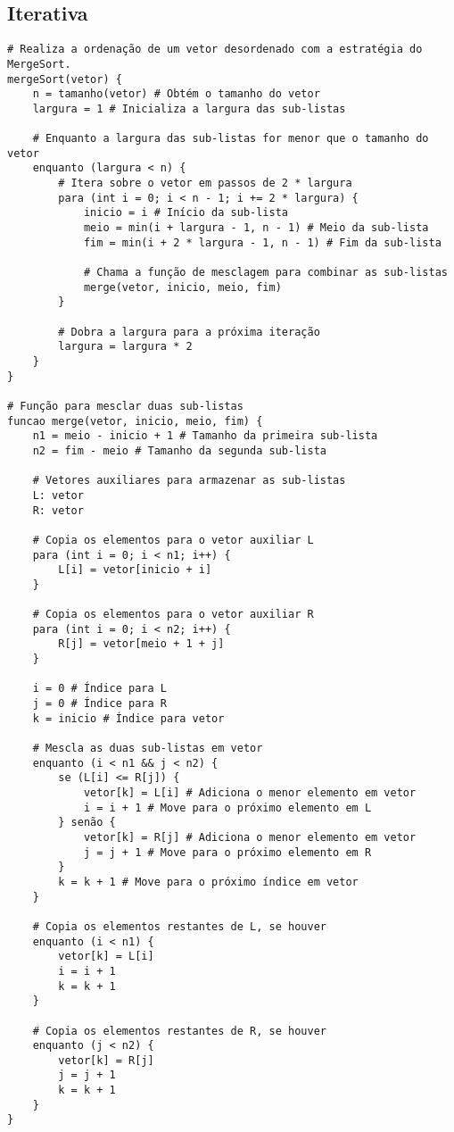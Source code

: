 \subsection{Iterativa}
\begin{verbatim}
# Realiza a ordenação de um vetor desordenado com a estratégia do MergeSort.
mergeSort(vetor) {
    n = tamanho(vetor) # Obtém o tamanho do vetor
    largura = 1 # Inicializa a largura das sub-listas

    # Enquanto a largura das sub-listas for menor que o tamanho do vetor
    enquanto (largura < n) {
        # Itera sobre o vetor em passos de 2 * largura
        para (int i = 0; i < n - 1; i += 2 * largura) {
            inicio = i # Início da sub-lista
            meio = min(i + largura - 1, n - 1) # Meio da sub-lista
            fim = min(i + 2 * largura - 1, n - 1) # Fim da sub-lista

            # Chama a função de mesclagem para combinar as sub-listas
            merge(vetor, inicio, meio, fim)
        }

        # Dobra a largura para a próxima iteração
        largura = largura * 2
    }
}

# Função para mesclar duas sub-listas
funcao merge(vetor, inicio, meio, fim) {
    n1 = meio - inicio + 1 # Tamanho da primeira sub-lista
    n2 = fim - meio # Tamanho da segunda sub-lista

    # Vetores auxiliares para armazenar as sub-listas
    L: vetor
    R: vetor

    # Copia os elementos para o vetor auxiliar L
    para (int i = 0; i < n1; i++) {
        L[i] = vetor[inicio + i]
    }

    # Copia os elementos para o vetor auxiliar R
    para (int i = 0; i < n2; i++) {
        R[j] = vetor[meio + 1 + j]
    }

    i = 0 # Índice para L
    j = 0 # Índice para R
    k = inicio # Índice para vetor

    # Mescla as duas sub-listas em vetor
    enquanto (i < n1 && j < n2) {
        se (L[i] <= R[j]) {
            vetor[k] = L[i] # Adiciona o menor elemento em vetor
            i = i + 1 # Move para o próximo elemento em L
        } senão {
            vetor[k] = R[j] # Adiciona o menor elemento em vetor
            j = j + 1 # Move para o próximo elemento em R
        }
        k = k + 1 # Move para o próximo índice em vetor
    }

    # Copia os elementos restantes de L, se houver
    enquanto (i < n1) {
        vetor[k] = L[i]
        i = i + 1
        k = k + 1
    }

    # Copia os elementos restantes de R, se houver
    enquanto (j < n2) {
        vetor[k] = R[j]
        j = j + 1
        k = k + 1
    }
}

\end{verbatim}